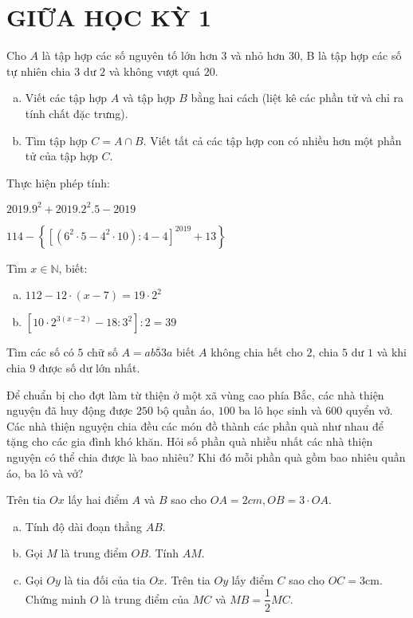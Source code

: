 \section{GIỮA HỌC KỲ 1}
\setcounter{ex}{0}
\begin{ex}Cho $A$ là tập hợp các số nguyên tố lớn hơn $3$ và nhỏ hơn $30$, B là tập hợp các số tự nhiên chia $3$ dư $2$ và không vượt quá $20$.
\begin{enumerate}[a)]
	\item Viết các tập hợp $A$ và tập hợp $B$ bằng hai cách (liệt kê các phần tử và chỉ ra tính chất đặc trưng).
	\item Tìm tập hợp $C=A \cap B$. Viết tất cả các tập hợp con có nhiều hơn một phần tử của tập hợp $C$.
	\end{enumerate}
\end{ex}
\begin{ex}
	Thực hiện phép tính:
	\begin{listEX}
	\item $2019.9^{2}+2019.2^{2} .5-2019$
	\item $114-\left\{\left[\left(6^{2} \cdot 5-4^{2} \cdot 10\right): 4-4\right]^{2019}+13\right\}$
	\end{listEX}
\end{ex}
\begin{ex}
	Tìm $x \in \mathbb{N}$, biết:
\begin{enumerate}[a)]
	\item $112-12 \cdot(x-7)=19 \cdot 2^{2}$
	\item $\left[10 \cdot 2^{3(x-2)}-18: 3^{2}\right]: 2=39$
	\end{enumerate}
\end{ex}
\begin{ex}
	Tìm các số có $5$ chữ số $A=\overline{a b 53 a}$ biết $A$ không chia hết cho $2$, chia $5$ dư $1$ và khi chia $9$ được số dư lớn nhất.
\end{ex}
\begin{ex}
	Để chuẩn bị cho đợt làm từ thiện ở một xã vùng cao phía Bắc, các nhà thiện nguyện đã huy động được $250$ bộ quần áo, $100$ ba lô học sinh và $600$ quyển vở. Các nhà thiện nguyện chia đều các món đồ thành các phần quà như nhau để tặng cho các gia đình khó khăn. Hỏi số phần quà nhiều nhất các nhà thiện nguyện có thể chia được là bao nhiêu? Khi đó mỗi phần quà gồm bao nhiêu quần áo, ba lô và vở?
\end{ex}
\begin{ex}
Trên tia $Ox$ lấy hai điểm $A$ và $B$ sao cho $OA=2 c m, OB=3 \cdot OA$.
\begin{enumerate}[a)]
	\item Tính độ dài đoạn thẳng $AB$.
	\item Gọi $M$ là trung điểm $OB$. Tính $AM$.
	\item Gọi $Oy$ là tia đối của tia $Ox$. Trên tia $Oy$ lấy điểm $C$ sao cho $O C=3 \mathrm{cm}$. Chứng minh $O$ là trung điểm của $MC$ và $M B=\dfrac{1}{2}M C$. 
	\end{enumerate}
\end{ex}
